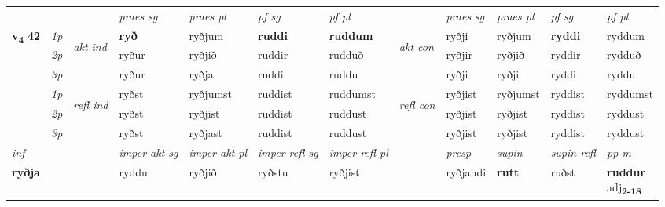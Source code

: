 \begin{longtable}[l]{X>{\footnotesize\itshape}llXXXXlXXXX}
\midrule
 & &   & \textit{praes sg}  & \textit{praes pl}    & \textit{ pf sg} & \textit{pf pl} & & \textit{praes sg}  & \textit{praes pl}    & \textit{pf sg} & \textit{pf pl }  \\ \cmidrule{4-7} \cmidrule{9-12}
 \multirow{2}{*}{{{\textbf{v{\textsubscript{4}}} \Large{\textbf{42}}}}}  & 1p & \multirow{3}{*}{\begin{turn}{90}\textit{akt ind}\end{turn}} & \textbf{ryð} & ryðjum & \textbf{ruddi} & \textbf{ruddum} & \multirow{3}{*}{\begin{turn}{90}\textit{akt con}\end{turn}} &ryðji & ryðjum & \textbf{ryddi} & ryddum\\*
 & 2p &  &  ryður  & ryðjið & ruddir & rudduð & & ryðjir & ryðjið & ryddir & rydduð \\*
 & 3p &  & ryður & ryðja & ruddi & ruddu & & ryðji & ryðji& ryddi & ryddu \\*
\cmidrule{4-7} \cmidrule{9-12}
 & 1p & \multirow{3}{*}{\begin{turn}{90}\textit{refl ind}\end{turn}}  & ryðst & ryðjumst & ruddist & ruddumst & \multirow{3}{*}{\begin{turn}{90}\textit{refl con}\end{turn}}  &ryðjist & ryðjumst & ryddist & ryddumst \\*
 & 2p &  & ryðst & ryðjist & ruddist & ruddust & &ryðjist & ryðjist & ryddist & ryddust \\*
 & 3p  & & ryðst & ryðjast & ruddist & ruddust & & ryðjist & ryðjist& ryddist & ryddust \\*
\cmidrule{4-7} \cmidrule{9-12}

   {\textit{inf}} & &  & \textit{imper akt sg} & \textit{imper akt pl} & \textit{imper refl sg} & \textit{imper refl pl} && \textit{presp} & \textit{supin} & \textit{supin refl} & \textit{pp m} \\*
  {\textbf{ryðja}} & && ryddu  & ryðjið & ryðstu & ryðjist && ryðjandi &  \textbf{rutt} & ruðst & \specialcell{\textbf{ruddur} \\ adj\textbf{\textsubscript{2-18}}} \\*

\midrule


\end{longtable}
